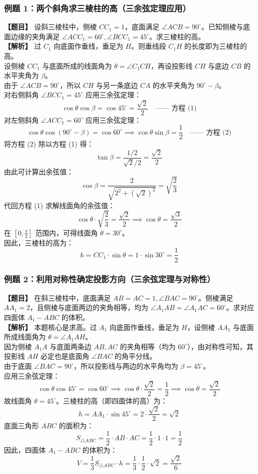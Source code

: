 \documentclass[11pt,a4paper]{ctexart}
\begin{document}
\subsubsection{例题 1：两个斜角求三棱柱的高（三余弦定理应用）}
\textbf{【题目】} 设斜三棱柱中，侧棱 $CC_1 = 1$，底面满足 $\angle ACB = 90^\circ$。已知侧棱与底面边缘的夹角满足 $\angle ACC_1 = 60^\circ, \angle BCC_1 = 45^\circ$。求三棱柱的高。\\
\textbf{【解析】} 过 $C_1$ 向底面作垂线，垂足为 $H$。则垂线段 $C_1H$ 的长度即为三棱柱的高。\\
设侧棱 $CC_1$ 与底面所成的线面角为 $\theta = \angle C_1CH$，再设投影线 $CH$ 与底边 $CB$ 的水平夹角为 $\beta$。\\
由于 $\angle ACB = 90^\circ$，所以 $CH$ 与另一条底边 $CA$ 的水平夹角为 $90^\circ - \beta$。\\
对右侧斜角 $\angle BCC_1 = 45^\circ$ 应用三余弦定理：
\[ \cos\theta \cos\beta = \cos 45^\circ = \frac{\sqrt{2}}{2} \quad \text{—— 方程 (1)} \]
对左侧斜角 $\angle ACC_1 = 60^\circ$ 应用三余弦定理：
\[ \cos\theta \cos(90^\circ - \beta) = \cos 60^\circ \implies \cos\theta \sin\beta = \frac{1}{2} \quad \text{—— 方程 (2)} \]
将方程 (2) 除以方程 (1) 得：
\[ \tan\beta = \frac{1/2}{\sqrt{2}/2} = \frac{\sqrt{2}}{2} \]
由此可计算出余弦值：
\[ \cos\beta = \frac{2}{\sqrt{2^2 + (\sqrt{2})^2}} = \sqrt{\frac{2}{3}} \]
代回方程 (1) 求解线面角的余弦值：
\[ \cos\theta \cdot \sqrt{\frac{2}{3}} = \frac{\sqrt{2}}{2} \implies \cos\theta = \frac{\sqrt{3}}{2} \]
在 $\left[0, \frac{\pi}{2}\right]$ 范围内，可得线面角 $\theta = 30^\circ$。\\
因此，三棱柱的高为：
\[ h = CC_1 \cdot \sin\theta = 1 \cdot \sin 30^\circ = \frac{1}{2} \]

\subsubsection{例题 2：利用对称性确定投影方向（三余弦定理与对称性）}
\textbf{【题目】} 在斜三棱柱中，底面满足 $AB = AC = 1, \angle BAC = 90^\circ$。侧棱满足 $AA_1 = 2$，且侧棱与底面两边的夹角相等，均为 $\angle A_1AB = \angle A_1AC = 60^\circ$。求对应四面体 $A_1-ABC$ 的体积。\\
\textbf{【解析】} 本题核心是求高。过 $A_1$ 向底面作垂线，垂足为 $H$，设侧棱 $AA_1$ 与底面所成线面角为 $\theta = \angle A_1AH$。\\
因为侧棱 $A_1A$ 与底面两条边 $AB, AC$ 的夹角相等（均为 $60^\circ$），由对称性可知，其投影线 $AH$ 必定也是底面角 $\angle BAC$ 的角平分线。\\
由于底面 $\angle BAC = 90^\circ$，所以投影线与两边的水平角均为 $\beta = 45^\circ$。\\
应用三余弦定理：
\[ \cos\theta \cos 45^\circ = \cos 60^\circ \implies \cos\theta \cdot \frac{\sqrt{2}}{2} = \frac{1}{2} \implies \cos\theta = \frac{\sqrt{2}}{2} \]
故线面角 $\theta = 45^\circ$。三棱柱的高（即四面体的高）为：
\[ h = AA_1 \cdot \sin 45^\circ = 2 \cdot \frac{\sqrt{2}}{2} = \sqrt{2} \]
底面三角形 $ABC$ 的面积为：
\[ S_{\triangle ABC} = \frac{1}{2} \cdot AB \cdot AC = \frac{1}{2} \cdot 1 \cdot 1 = \frac{1}{2} \]
因此，四面体 $A_1-ABC$ 的体积为：
\[ V = \frac{1}{3} S_{\triangle ABC} \cdot h = \frac{1}{3} \cdot \frac{1}{2} \cdot \sqrt{2} = \frac{\sqrt{2}}{6} \]
\end{document}
